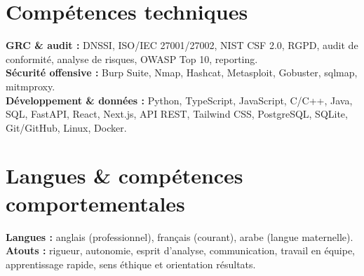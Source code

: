 \documentclass[10pt,a4paper]{article}
\begin{document}
\section*{Comp\'etences techniques}
\textbf{GRC \& audit :} DNSSI, ISO/IEC 27001/27002, NIST CSF 2.0, RGPD, audit de conformit\'e, analyse de risques, OWASP Top 10, reporting.\\[-1pt]
\textbf{S\'ecurit\'e offensive :} Burp Suite, Nmap, Hashcat, Metasploit, Gobuster, sqlmap, mitmproxy.\\[-1pt]
\textbf{D\'eveloppement \& donn\'ees :} Python, TypeScript, JavaScript, C/C++, Java, SQL, FastAPI, React, Next.js, API REST, Tailwind CSS, PostgreSQL, SQLite, Git/GitHub, Linux, Docker.

\section*{Langues \& comp\'etences comportementales}
\textbf{Langues :} anglais (professionnel), fran\c{c}ais (courant), arabe (langue maternelle). \quad
\textbf{Atouts :} rigueur, autonomie, esprit d'analyse, communication, travail en \'equipe, apprentissage rapide, sens \'ethique et orientation r\'esultats.
\end{document}
